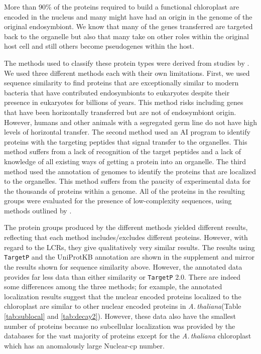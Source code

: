 \documentclass[a4paper,12pt]{article}
\newcommand{\ath}{\mbox{\textit{A.\,thaliana}}\xspace}
\newcommand{\tget}{\mbox{\texttt{TargetP}}\xspace}
\begin{document}
\begin{multicols}{2}
More than 90\% of the proteins required to build a functional chloroplast
are encoded in the nucleus \citep{Jarvis2008} and many might have
had an origin in the genome of the original endosymbiont.  We know
that many of the genes transferred are targeted back to the
organelle but also that many take on other roles within the original host
cell and still others become pseudogenes within the host. 

The methods used to classify these protein types were derived from
studies by \citet{MartinEtAl2002}.  We used three different methods
each with their own limitations.  First, we used sequence similarity
to find proteins that are exceptionally similar to modern bacteria that
have contributed endosymbionts to eukaryotes despite their presence in
eukaryotes for billions of years.  This method risks including genes
that have been horizontally transferred but are not of endosymbiont
origin. However, humans and other animals with a segregated germ line
do not have high levels of horizontal transfer.  The second method used
an AI program to identify proteins with the targeting peptides that
signal transfer to the organelles.  This method suffers from a lack of
recognition of the target peptides and a lack of knowledge of all existing
ways of getting a protein into an organelle. The third method used the
annotation of genomes to identify the proteins that are localized to
the organelles.  This method suffers from the paucity of experimental
data for the thousands of proteins within a genome. All of the proteins
in the resulting groups were evaluated for the presence of low-complexity
sequences, using methods outlined by \citet{EnrightEtAl2023}.

The protein groups produced by the different methods yielded different
results, reflecting that each method includes/excludes different proteins.
However, with regard to the LCRs, they give qualitatively very similar
results.  The results using \tget and the UniProtKB annotation are shown
in the supplement and mirror the results shown for sequence similarity
above. However, the annotated data provides far less data than either
similarity or \tget 2.0.  There are indeed some differences among the
three methods; for example, the annotated localization results suggest
that the nuclear encoded proteins localized to the chloroplast are similar
to other nuclear encoded proteins in \ath (Table \ref{tab:sublocal} and
\ref{tab:decay2}). However, these data also have the smallest number
of proteins because no subcellular localization was provided by the
databases for the vast majority of proteins except for the \ath
chloroplast which has an anomalously large Nuclear-cp number.


\end{multicols}
\end{document}
